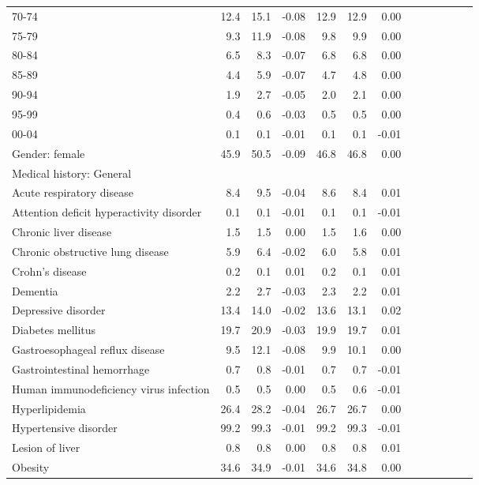\documentclass[11pt,]{article}
\begin{document}
\begin{longtable}{lrrrrrrrrrrrr}
      70-74 & 12.4 & 15.1 & -0.08 & 12.9 & 12.9 &  0.00 \\ 
      75-79 &  9.3 & 11.9 & -0.08 &  9.8 &  9.9 &  0.00 \\ 
      80-84 &  6.5 &  8.3 & -0.07 &  6.8 &  6.8 &  0.00 \\ 
      85-89 &  4.4 &  5.9 & -0.07 &  4.7 &  4.8 &  0.00 \\ 
      90-94 &  1.9 &  2.7 & -0.05 &  2.0 &  2.1 &  0.00 \\ 
      95-99 &  0.4 &  0.6 & -0.03 &  0.5 &  0.5 &  0.00 \\ 
      00-04 &  0.1 &  0.1 & -0.01 &  0.1 &  0.1 & -0.01 \\ 
  Gender: female & 45.9 & 50.5 & -0.09 & 46.8 & 46.8 &  0.00 \\ 
  Medical history: General &    &    &     &    &    &     \\ 
      Acute respiratory disease &  8.4 &  9.5 & -0.04 &  8.6 &  8.4 &  0.01 \\ 
      Attention deficit hyperactivity disorder &  0.1 &  0.1 & -0.01 &  0.1 &  0.1 & -0.01 \\ 
      Chronic liver disease &  1.5 &  1.5 &  0.00 &  1.5 &  1.6 &  0.00 \\ 
      Chronic obstructive lung disease &  5.9 &  6.4 & -0.02 &  6.0 &  5.8 &  0.01 \\ 
      Crohn's disease &  0.2 &  0.1 &  0.01 &  0.2 &  0.1 &  0.01 \\ 
      Dementia &  2.2 &  2.7 & -0.03 &  2.3 &  2.2 &  0.01 \\ 
      Depressive disorder & 13.4 & 14.0 & -0.02 & 13.6 & 13.1 &  0.02 \\ 
      Diabetes mellitus & 19.7 & 20.9 & -0.03 & 19.9 & 19.7 &  0.01 \\ 
      Gastroesophageal reflux disease &  9.5 & 12.1 & -0.08 &  9.9 & 10.1 &  0.00 \\ 
      Gastrointestinal hemorrhage &  0.7 &  0.8 & -0.01 &  0.7 &  0.7 & -0.01 \\ 
      Human immunodeficiency virus infection &  0.5 &  0.5 &  0.00 &  0.5 &  0.6 & -0.01 \\ 
      Hyperlipidemia & 26.4 & 28.2 & -0.04 & 26.7 & 26.7 &  0.00 \\ 
      Hypertensive disorder & 99.2 & 99.3 & -0.01 & 99.2 & 99.3 & -0.01 \\ 
      Lesion of liver &  0.8 &  0.8 &  0.00 &  0.8 &  0.8 &  0.01 \\ 
      Obesity & 34.6 & 34.9 & -0.01 & 34.6 & 34.8 &  0.00 \\ 

\end{longtable}
\end{document}
